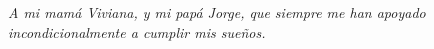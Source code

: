 \vspace*{0.4\textheight}
{\hfill{\Large{\emph{A mi mamá Viviana, y mi papá Jorge, que siempre me han apoyado incondicionalmente a cumplir mis sueños.}}}}
